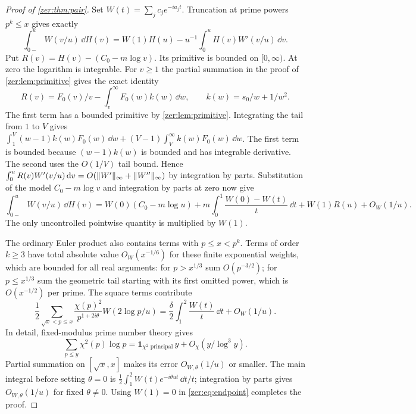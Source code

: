 \begin{proof}[Proof of \cref{zer:thm:pair}]
Set $W(t)=\sum_jc_je^{-ia_jt}$. Truncation at prime powers $p^k\le x$ gives exactly
\[
 \int_{0-}^uW(v/u)\,\dd H(v)=W(1)H(u)-u^{-1}\int_0^uH(v)W'(v/u)\,\dd v .
\]
Put $R(v)=H(v)-(C_0-m\log v)$. Its primitive is bounded on $[0,\infty)$. At zero the logarithm
is integrable. For $v\ge1$ the partial summation in the proof of \cref{zer:lem:primitive}
gives the exact identity
\[
 R(v)=F_0(v)/v-\int_v^\infty F_0(w)k(w)\,\dd w,\qquad k(w)=s_0/w+1/w^2 .
\]
The first term has a bounded primitive by \cref{zer:lem:primitive}. Integrating the tail from
$1$ to $V$ gives
$\int_1^V(w-1)k(w)F_0(w)\,\dd w+(V-1)\int_V^\infty k(w)F_0(w)\,\dd w$. The first term is
bounded because $(w-1)k(w)$ is bounded and has integrable derivative. The second uses the
$O(1/V)$ tail bound. Hence
$\int_0^uR(v)W'(v/u)\,\mathrm{d} v=O(\lVert W'\rVert_\infty+\lVert W''\rVert_\infty)$ by integration by parts.
Substitution of the model $C_0-m\log v$ and integration by parts at zero now give
\begin{equation}\label{zer:eq:endpoint}
 \int_{0-}^uW(v/u)\,\dd H(v)=W(0)(C_0-m\log u)+m\int_0^1\frac{W(0)-W(t)}t\,\dd t
   +W(1)R(u)+O_W(1/u).
\end{equation}
The only uncontrolled pointwise quantity is multiplied by $W(1)$.

The ordinary Euler product also contains terms with $p\le x<p^k$. Terms of order $k\ge3$ have
total absolute value $O_W(x^{-1/6})$ for these finite exponential weights, which are bounded
for all real arguments: for $p>x^{1/3}$ sum $O(p^{-3/2})$; for $p\le x^{1/3}$ sum the
geometric tail starting with its first omitted power, which is $O(x^{-1/2})$ per prime. The
square terms contribute
\[
 \frac12\sum_{\sqrt x<p\le x}\frac{\chi(p)^2}{p^{1+2i\theta}}W(2\log p/u)
 =\frac\delta2\int_1^2\frac{W(t)}t\,\dd t+O_W(1/u).
\]
In detail, fixed-modulus prime number theory gives
\[
 \sum_{p\le y}\chi^2(p)\log p=\mathbf 1_{\chi^2\text{ principal}}\,y+O_\chi(y/\log^3y).
\]
Partial summation on $[\sqrt x,x]$ makes its error $O_{W,\theta}(1/u)$ or smaller. The main
integral before setting $\theta=0$ is $\tfrac12\int_1^2W(t)e^{-i\theta ut}\,\dd t/t$;
integration by parts gives $O_{W,\theta}(1/u)$ for fixed $\theta\ne0$. Using $W(1)=0$ in
\eqref{zer:eq:endpoint} completes the proof.
\end{proof}

